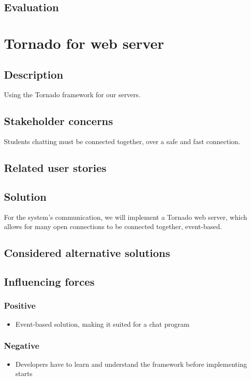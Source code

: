 \documentclass[12pt, a4paper]{article}
\begin{document}
\subsection{Evaluation}

\newpage
\section{Tornado for web server}
\subsection{Description}
Using the Tornado framework for our servers.
\subsection{Stakeholder concerns}
Students chatting must be connected together, over a safe and fast connection.
\subsection{Related user stories}

\subsection{Solution}
For the system's communication, we will implement a Tornado web server, which allows for many open connections to be connected together, event-based.
\subsection{Considered alternative solutions}

\subsection{Influencing forces}
\begin{minipage}{0.5\textwidth}
    \subsubsection*{Positive}
    \begin{itemize}
        \item Event-based solution, making it suited for a chat program
    \end{itemize}
\end{minipage}%
\begin{minipage}{0.5\textwidth}
    \subsubsection*{Negative}
    \begin{itemize}
        \item Developers have to learn and understand the framework before implementing starts
    \end{itemize}
\end{minipage}
\end{document}
